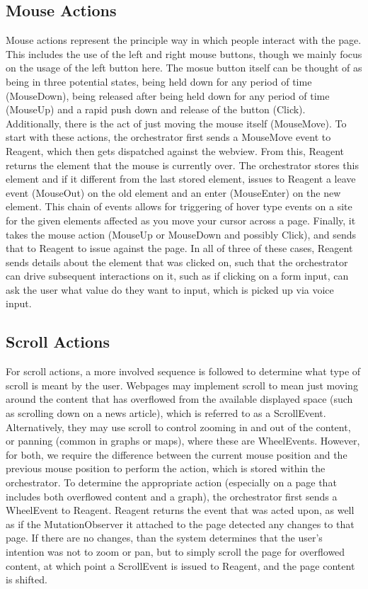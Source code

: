 \subsection{Mouse Actions}
Mouse actions represent the principle way in which people interact with the
page. This includes the use of the left and right mouse buttons, though we
mainly focus on the usage of the left button here. The mosue button itself can
be thought of as being in three potential states, being held down for any period
of time (MouseDown), being released after being held down for any period of time
(MouseUp) and a rapid push down and release of the button (Click). Additionally,
there is the act of just moving the mouse itself (MouseMove). To start with
these actions, the orchestrator first sends a MouseMove event to Reagent, which
then gets dispatched against the webview. From this, Reagent returns the element
that the mouse is currently over. The orchestrator stores this element and if it
different from the last stored element, issues to Reagent a leave event
(MouseOut) on the old element and an enter (MouseEnter) on the new element. This
chain of events allows for triggering of hover type events on a site for the
given elements affected as you move your cursor across a page. Finally, it takes
the mouse action (MouseUp or MouseDown and possibly Click), and sends that to
Reagent to issue against the page. In all of three of these cases,
Reagent sends details about the element that was clicked on, such that the
orchestrator can drive subsequent interactions on it, such as if clicking on a
form input, can ask the user what value do they want to input, which is picked
up via voice input.

\subsection{Scroll Actions}
For scroll actions, a more involved sequence is followed to determine what type
of scroll is meant by the user. Webpages may implement scroll to mean just
moving around the content that has overflowed from the available displayed space
(such as scrolling down on a news article), which is referred to as a
ScrollEvent. Alternatively, they may use scroll to control zooming in and out of
the content, or panning (common in graphs or maps), where these are WheelEvents.
However, for both, we require the difference between the current mouse position
and the previous mouse position to perform the action, which is stored within
the orchestrator. To determine the appropriate action (especially on a page that
includes both overflowed content and a graph), the orchestrator first sends a
WheelEvent to Reagent. Reagent returns the event that was acted upon, as well as
if the MutationObserver it attached to the page detected any changes to that
page. If there are no changes, than the system determines that the user's
intention was not to zoom or pan, but to simply scroll the page for overflowed
content, at which point a ScrollEvent is issued to Reagent, and the page content
is shifted.
